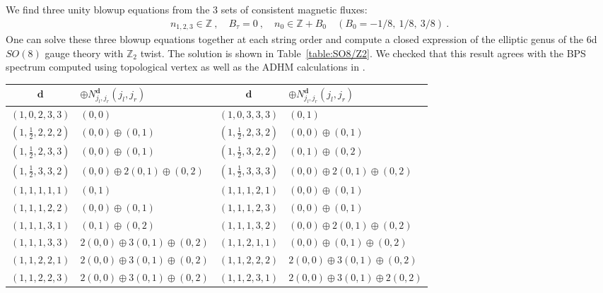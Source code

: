 We find three unity blowup equations from the 3 sets of consistent magnetic fluxes:
\begin{align}
n_{1, 2, 3} \in \mathbb{Z}\ , \quad
B_\tau = 0 \ , \quad
n_0 \in \mathbb{Z} + B_0 \quad (B_0 = -1/8,\ 1/8,\ 3/8) \ .
\end{align}
One can solve these three blowup equations together at each string order and compute a closed expression of the elliptic genus of the 6d $ SO(8) $ gauge theory with $ \mathbb{Z}_2 $ twist. The solution is shown in Table~\ref{table:SO8/Z2}. We checked that this result agrees with the BPS spectrum computed using topological vertex as well as the ADHM calculations in \cite{Kim:2021cua}.
\begin{table}
	\centering
	\begin{tabular}{|c|C{23ex}||c|C{23ex}|} \hline
		$\mathbf{d}$ & $\oplus N_{j_l, j_r}^{\mathbf{d}} (j_l, j_r)$ & $\mathbf{d}$ & $\oplus N_{j_l, j_r}^{\mathbf{d}} (j_l, j_r)$ \\ \hline
		$ (1, 0, 2, 3, 3) $ & $ (0, 0) $ & $ (1, 0, 3, 3, 3) $ & $ (0, 1) $ \\ \hline
		$ (1, \frac{1}{2}, 2, 2, 2) $ & $ (0, 0) \oplus (0, 1) $ & $ (1, \frac{1}{2}, 2, 3, 2) $ & $ (0, 0) \oplus (0, 1) $ \\ \hline
		$ (1, \frac{1}{2}, 2, 3, 3) $ & $ (0, 0) \oplus (0, 1) $ & $ (1, \frac{1}{2}, 3, 2, 2) $ & $ (0, 1) \oplus (0, 2) $ \\ \hline
		$ (1, \frac{1}{2}, 3, 3, 2) $ & $ (0, 0) \oplus 2(0, 1) \oplus (0, 2) $ & $ (1, \frac{1}{2}, 3, 3, 3) $ & $ (0, 0) \oplus 2(0, 1) \oplus (0, 2) $ \\ \hline
		$ (1, 1, 1, 1, 1) $ & $ (0, 1) $ & $ (1, 1, 1, 2, 1) $ & $ (0, 0) \oplus (0, 1) $ \\ \hline
		$ (1, 1, 1, 2, 2) $ & $ (0, 0) \oplus (0, 1) $ & $ (1, 1, 1, 2, 3) $ & $ (0, 0) \oplus (0, 1) $ \\ \hline
		$ (1, 1, 1, 3, 1) $ & $ (0, 1) \oplus (0, 2) $ & $ (1, 1, 1, 3, 2) $ & $ (0, 0) \oplus 2(0, 1) \oplus (0, 2) $ \\ \hline
		$ (1, 1, 1, 3, 3) $ & $ 2(0, 0) \oplus 3(0, 1) \oplus (0, 2) $ & $ (1, 1, 2, 1, 1) $ & $ (0, 0) \oplus (0, 1) \oplus (0, 2) $ \\ \hline
		$ (1, 1, 2, 2, 1) $ & $ 2(0, 0) \oplus 3(0, 1) \oplus (0, 2) $ & $ (1, 1, 2, 2, 2) $ & $ 2(0, 0) \oplus 3(0, 1) \oplus (0, 2) $ \\ \hline
		$ (1, 1, 2, 2, 3) $ & $ 2(0, 0) \oplus 3(0, 1) \oplus (0, 2) $ & $ (1, 1, 2, 3, 1) $ & $ \! 2(0, 0) \oplus 3(0, 1) \oplus 2(0, 2) \! $ \\ \hline

\end{tabular}
\end{table}
